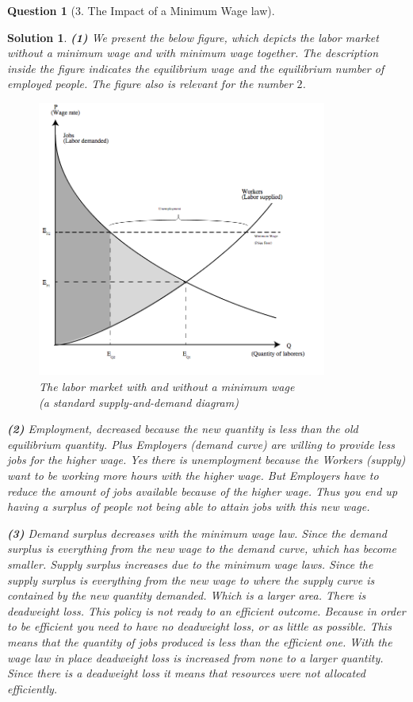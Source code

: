 \documentclass{article} %
\theoremstyle{quest}
\newtheorem*{question}{Question}
\newtheorem*{solution}{Solution}
\begin{document}
\pagebreak

\begin{question}[3. The Impact of a Minimum Wage law]
\end{question}
\begin{solution}
\textbf{(1)}
We present the below figure, which depicts the labor market without a minimum wage and with minimum
wage together. The description inside the figure indicates the equilibrium wage and the equilibrium
number of employed people. The figure also is relevant for the number $2$.
\begin{figure}[h!]
  \caption{The labor market with and without a minimum wage \\ (a standard supply-and-demand diagram)}
    \centering
  \includegraphics[width=0.85\textwidth]{graph3.jpg}
\end{figure}
\smallskip


\textbf{(2)}
Employment, decreased because the new quantity is less than the old equilibrium quantity. Plus Employers (demand curve) are willing to provide less jobs for the higher wage. Yes there is unemployment because the Workers (supply) want to be working more hours with the higher wage. But Employers have to reduce the amount of jobs available because of the higher wage. Thus you end up having a surplus of people not being able to attain jobs with this new wage. 

\pagebreak

\textbf{(3)}
Demand surplus decreases with the minimum wage law. Since the demand surplus is everything from the new wage to the demand curve, which has become smaller. Supply surplus increases due to the minimum wage laws. Since the supply surplus is everything from the new wage to where the supply curve is contained by the new quantity demanded. Which is a larger area. There is deadweight loss. This policy is not ready to an efficient outcome. Because in order to be efficient you need to have no deadweight loss, or as little as possible. This means that the quantity of jobs produced is less than the efficient one. With the wage law in place deadweight loss is increased from none to a larger quantity. Since there is a deadweight loss it means that resources were not allocated efficiently.

\end{solution}
\end{document}
